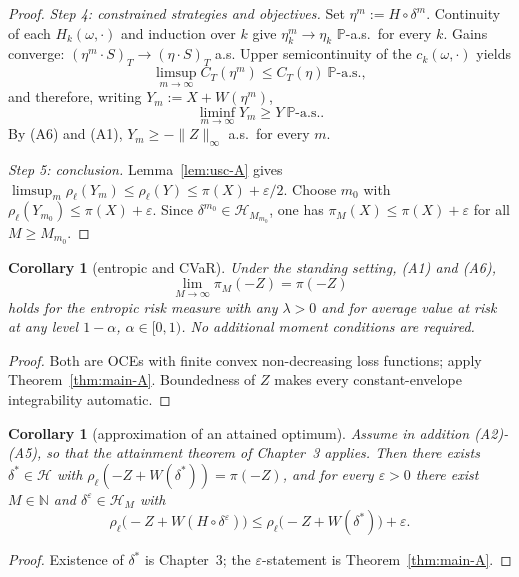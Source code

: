 \documentclass[11pt,a4paper]{report}
\numberwithin{equation}{chapter}
\theoremstyle{plain}
\newtheorem{corollary}[proposition]{Corollary}
\theoremstyle{definition}
\newcommand{\PP}{\mathbb{P}}
\newcommand{\N}{\mathbb{N}}
\newcommand{\HH}{\mathcal{H}}
\newcommand{\as}{\ \PP\text{-a.s.}}
\begin{document}
\begin{proof}
    \emph{Step 4: constrained strategies and objectives.} Set $\eta^m:=H\circ\delta^m$. Continuity of each $H_k(\omega,\cdot)$ and induction over $k$ give $\eta^m_k\to\eta_k$ $\PP$-a.s.\ for every $k$. Gains converge: $(\eta^m\cdot S)_T\to(\eta\cdot S)_T$ a.s. Upper semicontinuity of the $c_k(\omega,\cdot)$ yields
    \[
        \limsup_{m\to\infty}C_T(\eta^m)\le C_T(\eta)\as,
    \]
    and therefore, writing $Y_m:=X+W(\eta^m)$,
    \[
        \liminf_{m\to\infty}Y_m\ge Y\as.
    \]
    By (A6) and (A1), $Y_m\ge-\|Z\|_\infty$ a.s.\ for every $m$.

    \emph{Step 5: conclusion.} Lemma~\ref{lem:usc-A} gives $\limsup_m\rho_\ell(Y_m)\le\rho_\ell(Y)\le\pi(X)+\varepsilon/2$. Choose $m_0$ with $\rho_\ell(Y_{m_0})\le\pi(X)+\varepsilon$. Since $\delta^{m_0}\in\HH_{M_{m_0}}$, one has $\pi_M(X)\le\pi(X)+\varepsilon$ for all $M\ge M_{m_0}$.
\end{proof}

\begin{corollary}[entropic and CVaR]\label{cor:oce-A}
    Under the standing setting, \textup{(A1)} and \textup{(A6)},
    \[
        \lim_{M\to\infty}\pi_M(-Z)=\pi(-Z)
    \]
    holds for the entropic risk measure with any $\lambda>0$ and for average value at risk at any level $1-\alpha$, $\alpha\in[0,1)$. No additional moment conditions are required.
\end{corollary}

\begin{proof}
    Both are OCEs with finite convex non-decreasing loss functions; apply Theorem~\ref{thm:main-A}. Boundedness of $Z$ makes every constant-envelope integrability automatic.
\end{proof}

\begin{corollary}[approximation of an attained optimum]\label{cor:attained-A}
    Assume in addition \textup{(A2)}-\textup{(A5)}, so that the attainment theorem of Chapter~3 applies. Then there exists $\delta^*\in\HH$ with $\rho_\ell(-Z+W(\delta^*))=\pi(-Z)$, and for every $\varepsilon>0$ there exist $M\in\N$ and $\delta^\varepsilon\in\HH_M$ with
    \[
        \rho_\ell\bigl(-Z+W(H\circ\delta^\varepsilon)\bigr)\le\rho_\ell\bigl(-Z+W(\delta^*)\bigr)+\varepsilon.
    \]
\end{corollary}

\begin{proof}
    Existence of $\delta^*$ is Chapter~3; the $\varepsilon$-statement is Theorem~\ref{thm:main-A}.
\end{proof}
\end{document}
